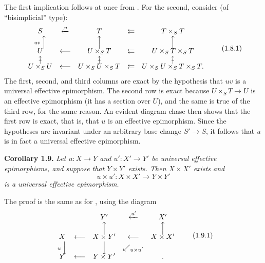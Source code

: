 The first implication follows at once from . For the second, consider  (of ``bisimplicial'' type):
\[
\begin{array}{ccccc}
  S & \xleftarrow{u} & T & \leftleftarrows & T\times_ST \\
  \scriptstyle uv\,\Big\uparrow
    & & \Big\uparrow & & \Big\uparrow \\[-0.25em]
  U & \longleftarrow & U\times_ST
    & \leftleftarrows & U\times_ST\times_ST \\
  \substack{\uparrow\\[-0.6ex]\uparrow}
    & & \substack{\uparrow\\[-0.6ex]\uparrow}
    & & \substack{\uparrow\\[-0.6ex]\uparrow} \\[-0.25em]
  U\times_SU & \longleftarrow & U\times_SU\times_ST
    & \leftleftarrows & U\times_SU\times_ST\times_ST .
\end{array}
\tag{1.8.1}\label{sga3:iv:proposition:1:8:eq:1:8:1:01}
\]
The first, second, and third columns are exact by the hypothesis that \(uv\)
is a universal effective epimorphism. The second row is exact because
\(U\times_ST\to U\) is an effective epimorphism (it has a section over
\(U\)), and the same is true of the third row, for the same reason. An
evident diagram chase then shows that the first row is exact, that is, that
\(u\) is an effective epimorphism. Since the hypotheses are invariant under
an arbitrary base change \(S'\to S\), it follows that \(u\) is in fact a
universal effective epimorphism.

\medskip
\noindent{}\textbf{Corollary 1.9.}
\textit{Let \(u:X\to Y\) and \(u':X'\to Y'\) be universal effective
epimorphisms, and suppose that \(Y\times Y'\) exists. Then \(X\times X'\)
exists and}
\[
  u\times u':X\times X'\longrightarrow Y\times Y'
\]
\textit{is a universal effective epimorphism.}

The proof is the same as for , using the diagram
\[
\begin{array}{ccccc}
   & & Y' & \xleftarrow{u'} & X' \\
   & & \Big\uparrow & & \Big\uparrow \\[-0.25em]
  X & \longleftarrow & X\times Y' & \longleftarrow & X\times X' \\
  \scriptstyle u\,\Big\downarrow
    & & \Big\downarrow & \swarrow_{\scriptstyle u\times u'} & \\[-0.25em]
  Y & \longleftarrow & Y\times Y' & & .
\end{array}
\tag{1.9.1}\label{sga3:iv:corollary:1:9:eq:1:9:1:01}
\]

